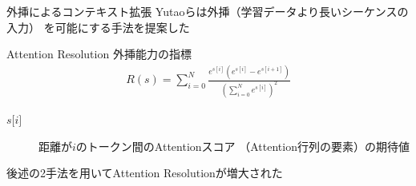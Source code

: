 \documentclass[dvipdfm, aspectratio=169]{beamer}
\begin{document}
    \begin{frame}{外挿によるコンテキスト拡張}
        Yutaoらは外挿（学習データより長いシーケンスの入力）
        を可能にする手法を提案した

        \begin{block}{Attention Resolution}
            外挿能力の指標
            \begin{align*}
                R(s) = \sum_{i=0}^N\frac{e^{s[i]}\left(e^{s[i]}-e^{s[i+1]}\right)}{\left(\sum_{i=0}^Ne^{s[i]}\right)^2}
            \end{align*}
            \begin{description}
                \item[$s\textrm{[}i\textrm{]}$]{
                    距離が$i$のトークン間のAttentionスコア
                    （Attention行列の要素）の期待値
                }
            \end{description}
        \end{block}

        後述の2手法を用いてAttention Resolutionが増大された
    \end{frame}
\end{document}
